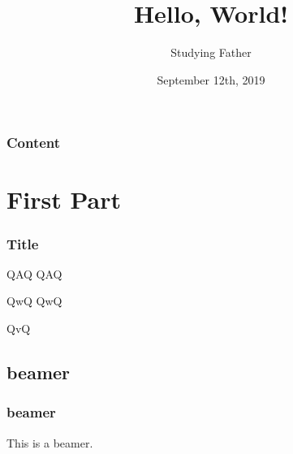 \documentclass{beamer}
\title{Hello, World!}
\author{Studying Father}
\institute{SFOI Team}
\date{September 12th, 2019}
\begin{document}
    \frame{\titlepage}

    \begin{frame}
        \frametitle{Content}
        \tableofcontents %
    \end{frame}

    \section{First Part} %

    \begin{frame}
        \frametitle{Title}
        \begin{block}{QAQ}
            QAQ
        \end{block}
        \begin{alertblock}{QwQ}
            QwQ
        \end{alertblock}
        \begin{example} %
            QvQ
        \end{example}
    \end{frame}

    \subsection{beamer} %

    \begin{frame}
        \frametitle{beamer}
        This is a beamer.
    \end{frame}
\end{document}
